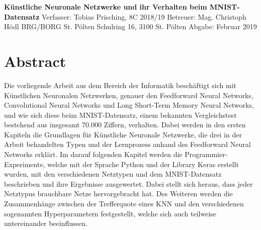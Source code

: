 \documentclass[
	a4paper,
	12pt,
	ngerman,
	oneside
]{scrreprt}											%
\begin{document}
	
	
	\newlength{\shiftdown}
	\newlength{\myshiftdown}
	
	\begin{titlepage}\label{Titleseite}
		\vspace*{80mm}\Huge\centering\textbf{Künstliche Neuronale Netzwerke \newline und ihr Verhalten beim MNIST-Datensatz\break}
		\vspace{0mm}\hrulefill
		\vspace{7mm}\Large{\break Verfasser: Tobias Prisching, 8C 2018/19 \break Betreuer: Mag. Christoph Hödl}
		\vspace{15mm}\Large{\break BRG/BORG St. Pölten \break Schulring 16, 3100 St. Pölten}
		\vspace{70mm}\Large{\break Abgabe: Februar 2019}
	\end{titlepage}



	\renewcommand{\abstractname}{Abstract}	
	\chapter*{Abstract}\label{Abstract}
		Die vorliegende Arbeit aus dem Bereich der Informatik beschäftigt sich mit Künstlichen Neuronalen Netzwerken, genauer den Feedforward Neural Networks, Convolutional Neural Networks und Long Short-Term Memory Neural Networks, und wie sich diese beim MNIST-Datensatz, einem bekannten Vergleichstest bestehend aus insgesamt 70.000 Ziffern, verhalten. Dabei werden in den ersten Kapiteln die Grundlagen für Künstliche Neuronale Netzwerke, die drei in der Arbeit behandelten Typen und der Lernprozess anhand des Feedforward Neural Networks erklärt. Im darauf folgenden Kapitel werden die Programmier-Experimente, welche mit der Sprache Python und der Library Keras erstellt wurden, mit den verschiedenen Netztypen und dem MNIST-Datensatz beschrieben und ihre Ergebnisse ausgewertet. Dabei stellt sich heraus, dass jeder Netztypus brauchbare Netze hervorgebracht hat. Des Weiteren werden die Zusammenhänge zwischen der Trefferquote eines KNN und den verschiedenen sogenannten Hyperparametern festgestellt, welche sich auch teilweise untereinander beeinflussen. 
		\thispagestyle{empty}
	
\end{document}
